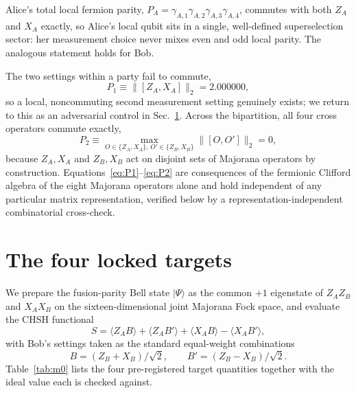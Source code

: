 \documentclass[aps,pra,twocolumn,superscriptaddress,floatfix,nofootinbib]{revtex4-2}
\providecommand{\ket}[1]{\lvert #1 \rangle}
\begin{document}
Alice's total local fermion parity,
$P_A=\gamma_{A,1}\gamma_{A,2}\gamma_{A,3}\gamma_{A,4}$, commutes with
both $Z_A$ and $X_A$ exactly, so Alice's local qubit sits in a single,
well-defined superselection sector: her measurement choice never mixes
even and odd local parity. The analogous statement holds for Bob.

The two settings within a party fail to commute,
\begin{equation}
\label{eq:P1}
P_1 \equiv \lVert[Z_A,X_A]\rVert_2 = 2.000000,
\end{equation}
so a local, noncommuting second measurement setting genuinely exists;
we return to this as an adversarial control in Sec.~\ref{sec:m0}.
Across the bipartition, all four cross operators commute exactly,
\begin{equation}
\label{eq:P2}
P_2 \equiv \max_{O\in\{Z_A,X_A\},\,O'\in\{Z_B,X_B\}} \lVert[O,O']\rVert_2 = 0,
\end{equation}
because $Z_A,X_A$ and $Z_B,X_B$ act on disjoint sets of Majorana
operators by construction. Equations~\eqref{eq:P1}--\eqref{eq:P2} are
consequences of the fermionic Clifford algebra of the eight Majorana
operators alone and hold independent of any particular matrix
representation, verified below by a representation-independent
combinatorial cross-check.

\section{The four locked targets}
\label{sec:m0}

We prepare the fusion-parity Bell state $\ket{\Psi}$ as the common
$+1$ eigenstate of $Z_AZ_B$ and $X_AX_B$ on the sixteen-dimensional
joint Majorana Fock space, and evaluate the CHSH functional
\begin{equation}
\label{eq:chsh}
S = \langle Z_A B\rangle + \langle Z_A B'\rangle
  + \langle X_A B\rangle - \langle X_A B'\rangle,
\end{equation}
with Bob's settings taken as the standard equal-weight combinations
\begin{equation}
\label{eq:settings}
B=(Z_B+X_B)/\sqrt2, \qquad B'=(Z_B-X_B)/\sqrt2 .
\end{equation}
Table~\ref{tab:m0} lists
the four pre-registered target quantities together with the ideal
value each is checked against.
\end{document}
